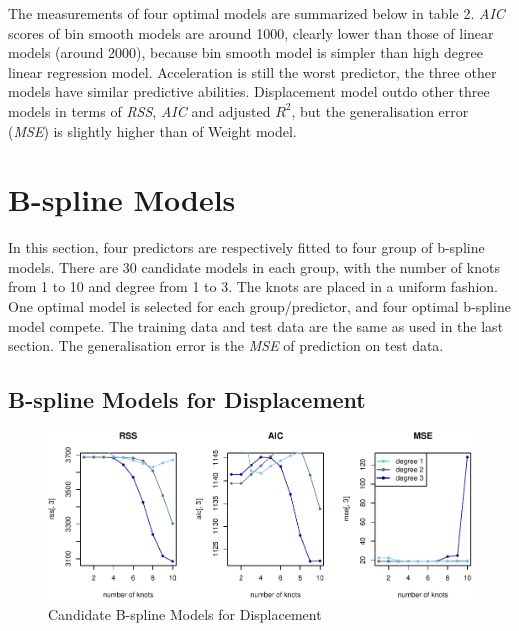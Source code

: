 \documentclass[]{article}
\begin{document}
The measurements of four optimal models are summarized below in table 2.
\emph{AIC} scores of bin smooth models are around 1000, clearly lower
than those of linear models (around 2000), because bin smooth model is
simpler than high degree linear regression model. Acceleration is still
the worst predictor, the three other models have similar predictive
abilities. Displacement model outdo other three models in terms of
\emph{RSS}, \emph{AIC} and adjusted \(R^2\), but the generalisation
error (\emph{MSE}) is slightly higher than of Weight model.

\hypertarget{b-spline-models}{%
\section{B-spline Models}\label{b-spline-models}}

In this section, four predictors are respectively fitted to four group
of b-spline models. There are 30 candidate models in each group, with
the number of knots from 1 to 10 and degree from 1 to 3. The knots are
placed in a uniform fashion. One optimal model is selected for each
group/predictor, and four optimal b-spline model compete. The training
data and test data are the same as used in the last section. The
generalisation error is the \emph{MSE} of prediction on test data.

\hypertarget{b-spline-models-for-displacement}{%
\subsection{B-spline Models for
Displacement}\label{b-spline-models-for-displacement}}

\begin{figure}

{\centering \includegraphics{Report_files/figure-latex/bs-d-1} 

}

\caption{Candidate B-spline Models for Displacement}\label{fig:bs-d}
\end{figure}
\end{document}
